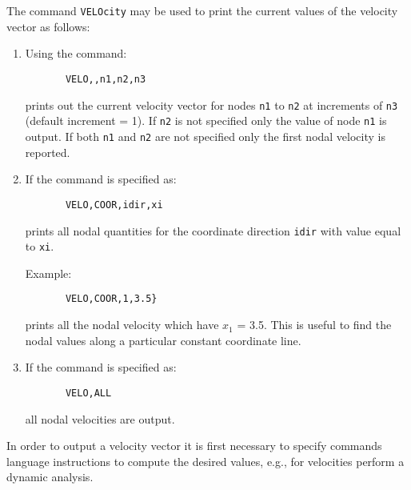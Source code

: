  \\{\smallskip}
 \\{\smallskip}
\headb

The command {\tt VELOcity} may be used to print the
current values of the velocity vector as follows:
\begin{enumerate}
\item{
Using the command:
\begin{verbatim}
       VELO,,n1,n2,n3
\end{verbatim}
prints out the current velocity vector for nodes
{\tt n1} to {\tt n2} at increments of {\tt n3} (default increment = 1).  If
{\tt n2} is not specified only the value of node {\tt n1} is
output.  If both {\tt n1} and {\tt n2} are not specified only
the first nodal velocity is reported.}
\item{
If the command is specified as:
\begin{verbatim}
       VELO,COOR,idir,xi
\end{verbatim}
prints all nodal quantities for the coordinate direction {\tt idir}
with value equal to {\tt xi}.

Example:
\begin{verbatim}
       VELO,COOR,1,3.5}
\end{verbatim}
prints all the nodal velocity which have $x_1$ = 3.5.
This is useful to find the nodal values along a particular
constant coordinate line.}
\item{
If the command is specified as:
\begin{verbatim}
       VELO,ALL
\end{verbatim}
all nodal velocities are output.}
\end{enumerate}

In order to output a velocity vector it is first necessary to
specify commands language instructions to compute the desired
values, e.g., for velocities perform a dynamic analysis.
\vfill\eject
